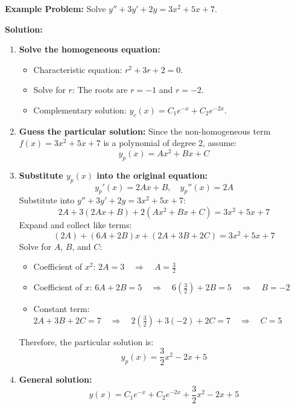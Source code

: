 \documentclass[10pt]{article}
\begin{document}
\textbf{Example Problem:} Solve \( y'' + 3y' + 2y = 3x^2 + 5x + 7 \).

\textbf{Solution:}
\begin{enumerate}
    \item \textbf{Solve the homogeneous equation:}
    \begin{itemize}
        \item Characteristic equation: \( r^2 + 3r + 2 = 0 \).
        \item Solve for \( r \): The roots are \( r = -1 \) and \( r = -2 \).
        \item Complementary solution: \( y_c(x) = C_1 e^{-x} + C_2 e^{-2x} \).
    \end{itemize}
    
    \item \textbf{Guess the particular solution:} Since the non-homogeneous term \( f(x) = 3x^2 + 5x + 7 \) is a polynomial of degree 2, assume:
    \[
    y_p(x) = A x^2 + B x + C
    \]
    
    \item \textbf{Substitute \( y_p(x) \) into the original equation:}
    \[
    y_p'(x) = 2A x + B, \quad y_p''(x) = 2A
    \]
    Substitute into \( y'' + 3y' + 2y = 3x^2 + 5x + 7 \):
    \[
    2A + 3(2A x + B) + 2(A x^2 + B x + C) = 3x^2 + 5x + 7
    \]
    Expand and collect like terms:
    \[
    (2A) + (6A + 2B)x + (2A + 3B + 2C) = 3x^2 + 5x + 7
    \]
    Solve for \( A \), \( B \), and \( C \):
    \begin{itemize}
        \item Coefficient of \( x^2 \): \( 2A = 3 \quad \Rightarrow \quad A = \frac{3}{2} \)
        \item Coefficient of \( x \): \( 6A + 2B = 5 \quad \Rightarrow \quad 6\left(\frac{3}{2}\right) + 2B = 5 \quad \Rightarrow \quad B = -2 \)
        \item Constant term: \( 2A + 3B + 2C = 7 \quad \Rightarrow \quad 2\left(\frac{3}{2}\right) + 3(-2) + 2C = 7 \quad \Rightarrow \quad C = 5 \)
    \end{itemize}
    Therefore, the particular solution is:
    \[
    y_p(x) = \frac{3}{2} x^2 - 2x + 5
    \]
    
    \item \textbf{General solution:}
    \[
    y(x) = C_1 e^{-x} + C_2 e^{-2x} + \frac{3}{2} x^2 - 2x + 5
    \]
\end{enumerate}


\end{document}
